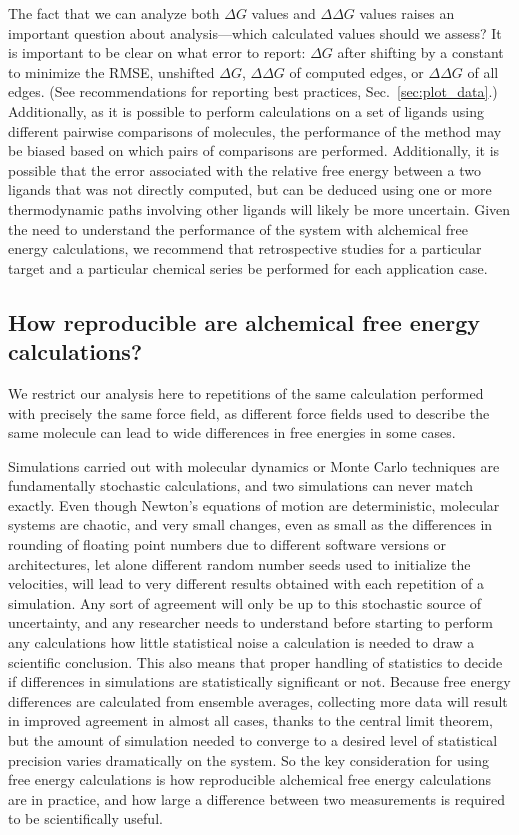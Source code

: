 \documentclass[9pt,bestpractices]{livecoms}
\begin{document}
The fact that we can analyze both $\Delta G$ values and $\Delta \Delta G$ values raises an important question about analysis---which calculated values should we assess? It is important to be clear on what error to report: $\Delta G$ after shifting by a constant to minimize the RMSE, unshifted $\Delta G$, $\Delta \Delta G$ of computed edges, or $\Delta \Delta G$ of all edges. (See recommendations for reporting best practices, Sec.~\ref{sec:plot_data}.) Additionally, as it is possible to perform calculations on a set of ligands using different pairwise comparisons of molecules, the performance of the method may be biased based on which pairs of comparisons are performed. Additionally, it is possible that the error associated with the relative free energy between a two ligands that was not directly computed,  but can be deduced using one or more thermodynamic paths involving other ligands will likely be more uncertain.
Given the need to understand the performance of the system with alchemical free energy calculations, we recommend that retrospective studies for a particular target and a particular chemical series be performed for each application case.

\subsection{How reproducible are alchemical free energy calculations?}
\label{subsec:reproducible}
We restrict our analysis here to repetitions of the same calculation performed with precisely the same force field, as different force fields used to describe the same molecule can lead to wide differences in free energies in some cases.  

Simulations carried out with molecular dynamics or Monte Carlo techniques are fundamentally stochastic calculations, and two simulations can never match exactly.  Even though Newton's equations of motion are deterministic, molecular systems are chaotic, and very small changes, even as small as the  differences in rounding of floating point numbers due to different software versions or architectures, let alone different random number seeds used to initialize the velocities, will lead to very different results obtained with each repetition of a simulation. Any sort of agreement will only be up to this stochastic source of uncertainty, and any researcher needs to understand before starting to perform any calculations how little statistical noise a calculation is needed to draw a scientific conclusion. This also means that proper handling of statistics to decide if differences in simulations are statistically significant or not.  Because free energy differences are calculated from ensemble averages, collecting more data will result in improved agreement in almost all cases, thanks to the central limit theorem, but the amount of simulation needed to converge to a desired level of statistical precision varies dramatically on the system. So the key consideration for using free energy calculations is how reproducible alchemical free energy calculations are in practice, and how large a difference between two measurements is required to be scientifically useful.
\end{document}
